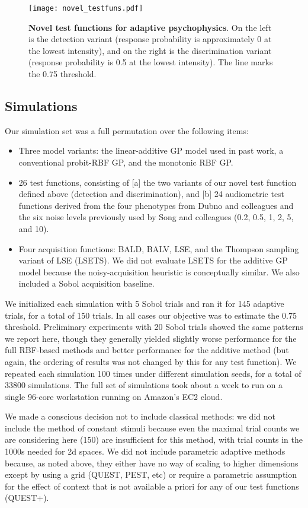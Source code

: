 \documentclass[../main.tex]{subfiles}
\begin{document}
\begin{figure}[htb]
  \centering
  \texttt{[image: novel\_testfuns.pdf]}
  \caption{\textbf{Novel test functions for adaptive psychophysics}. On the left is the detection variant (response probability is approximately 0 at the lowest intensity), and on the right is the discrimination variant (response probability is 0.5 at the lowest intensity). The line marks the 0.75 threshold.}
  \label{fig:novel-testfuns}
\end{figure}

\subsection{Simulations}
Our simulation set was a full permutation over the following items:
\begin{itemize}
  \item Three model variants: the linear-additive GP model used in past work, a conventional probit-RBF GP, and the monotonic RBF GP.
  \item 26 test functions, consisting of [a] the two variants of our novel test function defined above (detection and discrimination), and [b] 24 audiometric test functions derived from the four phenotypes from Dubno and colleagues and the six noise levels previously used by Song and colleagues (0.2, 0.5, 1, 2, 5, and 10).
  \item Four acquisition functions: BALD, BALV, LSE, and the Thompson sampling variant of LSE (LSETS). We did not evaluate LSETS for the additive GP model because the noisy-acquisition heuristic is conceptually similar. We also included a Sobol acquisition baseline.
\end{itemize}

We initialized each simulation with 5 Sobol trials and ran it for 145 adaptive trials, for a total of 150 trials. In all cases our objective was to estimate the 0.75 threshold. Preliminary experiments with 20 Sobol trials showed the same patterns we report here, though they generally yielded slightly worse performance for the full RBF-based methods and better performance for the additive method (but again, the ordering of results was not changed by this for any test function). We repeated each simulation 100 times under different simulation seeds, for a total of 33800 simulations. The full set of simulations took about a week to run on a single 96-core workstation running on Amazon's EC2 cloud.

We made a conscious decision not to include classical methods: we did not include the method of constant stimuli because even the maximal trial counts we are considering here (150) are insufficient for this method, with trial counts in the 1000s needed for 2d spaces. We did not include parametric adaptive methods because, as noted above, they either have no way of scaling to higher dimensions except by using a grid (QUEST, PEST, etc) or require a parametric assumption for the effect of context that is not available a priori for any of our test functions (QUEST+).
\end{document}
